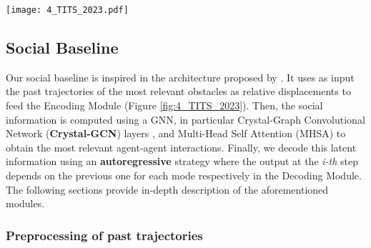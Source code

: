 \begin{figure*}[!ht]
	\centering
	\setlength{\tabcolsep}{2.0pt}
	\texttt{[image: 4\_TITS\_2023.pdf]}
	\caption[Overview of our final efficient baseline model]{Overview of our final efficient baseline model (\textbf{\textcolor{blue}{Blue links}} and \textbf{\textcolor{red}{Red links}} represent \textbf{\textcolor{blue}{Social}} and \textbf{\textcolor{red}{Map}} information respectively). We distinguish three main blocks: 1) \textbf{Encoding module}, which uses plausible HD Map information (specific centerlines and driveable area around) and agents past trajectories to compute the motion and physical latent features, 2) \textbf{Social Attention module}, which calculates the interaction among the different agents and returns the most relevant social features, 3) \textbf{Decoding module}, responsible for calculating the multimodal prediction by means of an auto-regressive strategy concatenating low-level map features and social features as a baseline, as well as iterating over the different latent centerlines for specific physical information per mode.}
	\label{fig:4_TITS_2023}
\end{figure*}

\subsection{Social Baseline}
\label{subsec:4_efficient_baselines_social}

Our social baseline is inspired in the architecture proposed by \cite{schmidt2022crat}. It uses as input the past trajectories of the most relevant obstacles as relative displacements to feed the Encoding Module (Figure \ref{fig:4_TITS_2023}). Then, the social information is computed using a \ac{GNN}, in particular Crystal-Graph Convolutional Network (\textbf{Crystal-GCN}) layers \cite{xie2018crystal, schmidt2022crat}, and Multi-Head Self Attention (MHSA) \cite{vaswani2017attention} to obtain the most relevant agent-agent interactions. Finally, we decode this latent information using an \textbf{autoregressive} strategy where the output at the \textit{i-th} step depends on the previous one for each mode respectively in the Decoding Module. The following sections provide in-depth description of the aforementioned modules.

\subsubsection{Preprocessing of past trajectories}
\label{subsubsec:4_efficient_baselines_social_preprocessing}

